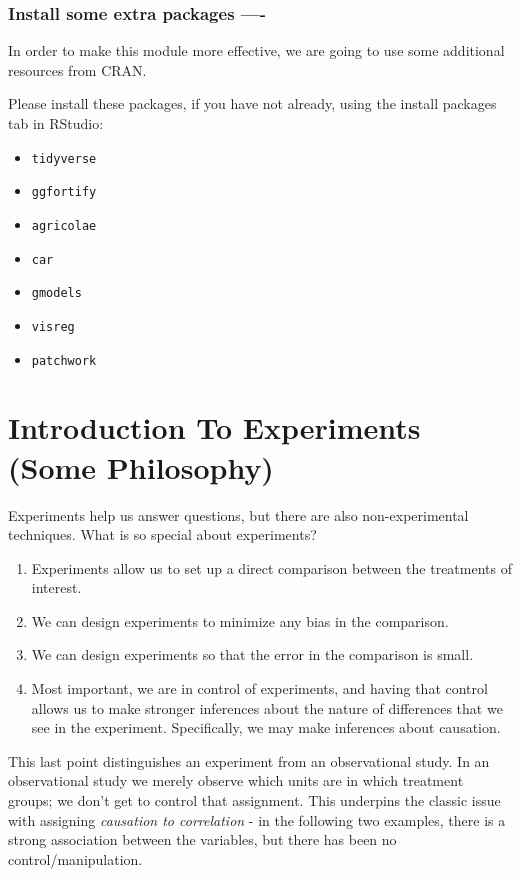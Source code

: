 \documentclass[
]{book}
\providecommand{\tightlist}{%
  \setlength{\itemsep}{0pt}\setlength{\parskip}{0pt}}
\begin{document}
\hypertarget{install-some-extra-packages--}{%
\subsection{Install some extra packages ----}\label{install-some-extra-packages--}}

In order to make this module more effective, we are going to use some additional resources from CRAN.

Please install these packages, if you have not already, using the install packages tab in RStudio:

\begin{itemize}
\tightlist
\item
  \texttt{tidyverse}
\item
  \texttt{ggfortify}
\item
  \texttt{agricolae}
\item
  \texttt{car}
\item
  \texttt{gmodels}
\item
  \texttt{visreg}
\item
  \texttt{patchwork}
\end{itemize}

\hypertarget{intro}{%
\chapter{Introduction To Experiments (Some Philosophy)}\label{intro}}

Experiments help us answer questions, but there are also non-experimental techniques. What is so special about experiments?

\begin{enumerate}
\def\labelenumi{\arabic{enumi}.}
\tightlist
\item
  Experiments allow us to set up a direct comparison between the treatments of interest.
\item
  We can design experiments to minimize any bias in the comparison.
\item
  We can design experiments so that the error in the comparison is small.
\item
  Most important, we are in control of experiments, and having that control allows us to make stronger inferences about the nature of differences
  that we see in the experiment. Specifically, we may make inferences about causation.
\end{enumerate}

This last point distinguishes an experiment from an observational study. In an observational study we merely observe which units are in which treatment groups; we don't get to control that assignment. This underpins the classic issue with assigning \emph{causation to correlation} - in the following two examples, there is a strong association between the variables, but there has been no control/manipulation.
\end{document}
